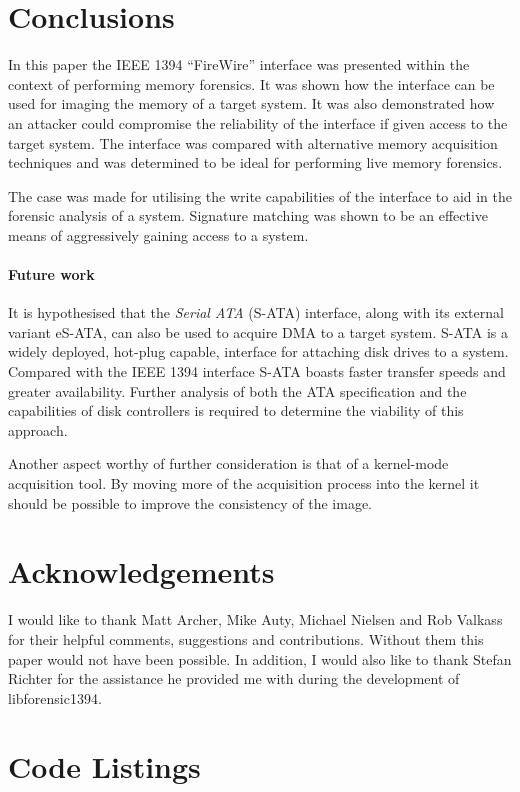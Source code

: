 \documentclass[numbers=noenddot,      %
               abstract,              %
               captions=tableheading, %
               DIV=8]                 %
              {scrartcl}
\begin{document}
\section{Conclusions}
\label{sec:conclusions}

In this paper the IEEE 1394 ``FireWire'' interface was presented within
the context of performing memory forensics. It was shown how the
interface can be used for imaging the memory of a target system. It was
also demonstrated how an attacker could compromise the reliability of
the interface if given access to the target system. The interface was
compared with alternative memory acquisition techniques and was
determined to be ideal for performing live memory forensics.

The case was made for utilising the write capabilities of the interface
to aid in the forensic analysis of a system. Signature matching was
shown to be an effective means of aggressively gaining access to a
system.

\paragraph{Future work}
It is hypothesised that the \emph{Serial ATA} (S-ATA) interface, along
with its external variant eS-ATA, can also be used to acquire DMA to a
target system. S-ATA is a widely deployed, hot-plug capable, interface
for attaching disk drives to a system. Compared with the IEEE 1394
interface S-ATA boasts faster transfer speeds and greater
availability. Further analysis of both the ATA specification and the
capabilities of disk controllers is required to determine the viability
of this approach.

Another aspect worthy of further consideration is that of a kernel-mode
acquisition tool. By moving more of the acquisition process into the
kernel it should be possible to improve the consistency of the image.

\section*{Acknowledgements}
I would like to thank Matt Archer, Mike Auty, Michael Nielsen and Rob
Valkass for their helpful comments, suggestions and
contributions. Without them this paper would not have been possible. In
addition, I would also like to thank Stefan Richter for the assistance
he provided me with during the development of libforensic1394.

\appendix
\newpage
\section{Code Listings}
\label{sec:listings}
\end{document}
